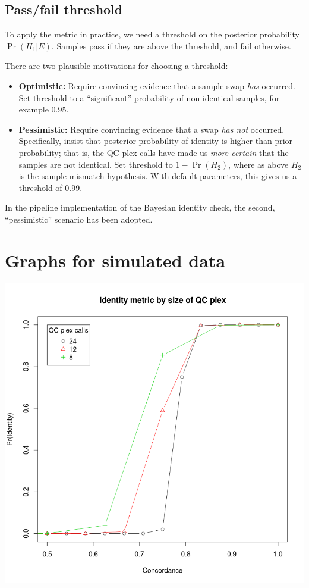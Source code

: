 \documentclass{article}
\begin{document}
\subsection*{Pass/fail threshold}

To apply the metric in practice, we need a threshold on the posterior probability $\Pr(H_1|E)$. Samples pass if they are above the threshold, and fail otherwise.

There are two plausible motivations for choosing a threshold:

\begin{itemize}
\item \textbf{Optimistic:} Require convincing evidence that a sample swap \emph{has} occurred. Set threshold to a ``significant'' probability of non-identical samples, for example 0.95.
\item \textbf{Pessimistic:} Require convincing evidence that a swap \emph{has not} occurred. Specifically, insist that posterior probability of identity is higher than prior probability; that is, the QC plex calls have made us \emph{more certain} that the samples are not identical. Set threshold to $1 - \Pr(H_2)$, where as above $H_2$ is the sample mismatch hypothesis. With default parameters, this gives us a threshold of 0.99.
\end{itemize}

In the pipeline implementation of the Bayesian identity check, the second, ``pessimistic'' scenario has been adopted.

\section{Graphs for simulated data}

\includegraphics[scale=0.5]{identity_by_plex_size}
\end{document}
